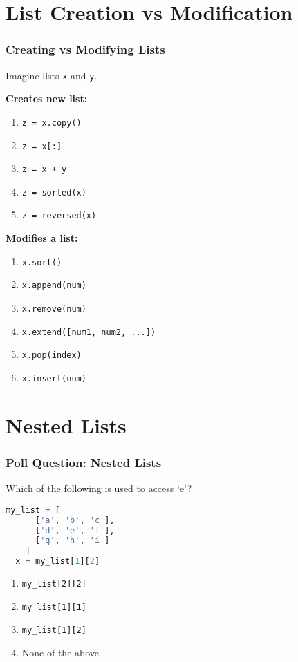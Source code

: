 \documentclass{beamer}
\begin{document}
\section{List Creation vs Modification}

%
%
\begin{frame}[fragile]
  \frametitle{Creating vs Modifying Lists}
  Imagine lists \lstinline|x| and \lstinline|y|.\\
  \vfill
  \begin{minipage}{0.49\textwidth}
    \textbf{Creates new list:}
    \begin{enumerate}[A]
      \item \lstinline|z = x.copy()|
      \item \lstinline|z = x[:]|
      \item \lstinline|z = x + y|
      \item \lstinline|z = sorted(x)|
      \item \lstinline|z = reversed(x)|
    \end{enumerate}
  \end{minipage}
  \begin{minipage}{0.49\textwidth}
    \textbf{Modifies a list:}
    \begin{enumerate}[A]
      \item \lstinline|x.sort()|
      \item \lstinline|x.append(num)|
      \item \lstinline|x.remove(num)|
      \item \lstinline|x.extend([num1, num2, ...])|
      \item \lstinline|x.pop(index)|
      \item \lstinline|x.insert(num)|
    \end{enumerate}
  \end{minipage}
\end{frame}



\section{Nested Lists}

\begin{frame}[fragile]
  \frametitle{Poll Question: Nested Lists}
  Which of the following is used to access `e'?
  \begin{lstlisting}[language=Python, autogobble]
  my_list = [
      ['a', 'b', 'c'],
      ['d', 'e', 'f'],
      ['g', 'h', 'i']
    ]
  x = my_list[1][2]
  \end{lstlisting}
  \vfill
  \begin{enumerate}[A]
    \item \lstinline|my_list[2][2]|
    \item \lstinline|my_list[1][1]|
    \item \lstinline|my_list[1][2]|
    \item None of the above
  \end{enumerate}
\end{frame}
\end{document}
